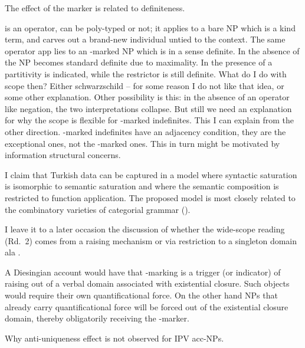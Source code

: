\documentclass[11pt,a4paper]{article}
\begin{document}
The effect of the marker is related to definiteness.

 is an operator, can be poly-typed or not; it applies to a bare NP which is a kind term, and carves out a brand-new individual untied to the context. The same operator app		 lies to an \acc-marked NP which is in a sense definite. In the absence of  the NP becomes standard definite due to maximality. In the presence of  a partitivity is indicated, while the restrictor is still definite. What do I do with scope then? Either schwarzschild -- for some reason I do not like that idea, or some other explanation. Other possibility is this: in the absence of an operator like negation, the two interpretations collapse. But still we need an explanation for why the scope is flexible for \acc-marked indefinites. This I can explain from the other direction. \zero-marked indefinites have an adjacency condition, they are the exceptional ones, not the \acc-marked ones. This in turn might be motivated by information structural concerns.    



I claim that Turkish data can be captured in a model where syntactic saturation is isomorphic to semantic saturation and where the semantic composition is restricted to function application. The proposed model is most closely related to the combinatory varieties of categorial grammar (\cite{steedman00b,jacobson99}). 

I leave it to a later occasion the discussion of whether the wide-scope
reading (Rd.\ 2) comes from a raising mechanism or via restriction to a
singleton domain ala .

A Diesingian account would have that \acc-marking is a trigger (or indicator) of
raising out of a verbal domain associated with existential closure. Such objects
would require their own quantificational force. On the other hand NPs that
already carry quantificational force will be forced out of the existential
closure domain, thereby obligatorily receiving the \acc-marker.


\begin{uquestion}
Why anti-uniqueness effect is not observed for IPV acc-NPs.
\end{uquestion}
\end{document}
